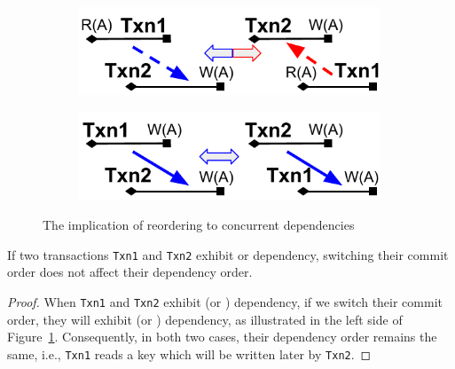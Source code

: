 {\begin{figure}[tp]
      \centering
      \begin{subfigure}{0.46\textwidth}
        \includegraphics[width=0.99\textwidth]{diagram/txn/theory_order_rw.pdf}
      \end{subfigure}      
      \begin{subfigure}{0.46\textwidth}
        \includegraphics[width=0.99\textwidth]{diagram/txn/theory_order_ww.pdf}
      \end{subfigure}
      \caption{The implication of reordering to concurrent dependencies}
      \label{diagram:txn:theory_reorder}
\end{figure}

\begin{lemma} 
  \label{lemma:reorder_rw}
  If two transactions \texttt{Txn1} and \texttt{Txn2} exhibit  or
   dependency, switching their commit order does not affect
  their dependency order.
\end{lemma}

\begin{proof}
  When \texttt{Txn1} and \texttt{Txn2} exhibit  (or
  ) dependency, if we switch their commit order, they will
  exhibit  (or ) dependency, as illustrated in the left side of Figure~\ref{diagram:txn:theory_reorder}.
  Consequently, in both two cases, their dependency order remains the same,
  i.e., \texttt{Txn1} reads a key which will be written later by \texttt{Txn2}.
\end{proof}

}
